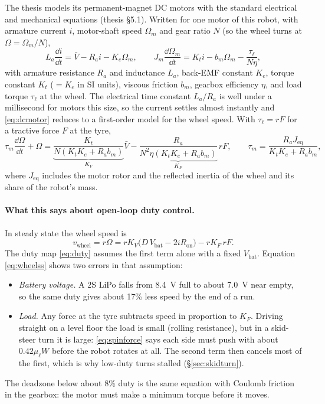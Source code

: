 The thesis models its permanent-magnet DC motors with the standard
electrical and mechanical equations (thesis \S5.1). Written for one motor of
this robot, with armature current $i$, motor-shaft speed $\Omega_m$ and gear
ratio $N$ (so the wheel turns at $\Omega=\Omega_m/N$),
\begin{equation}\label{eq:dcmotor}
L_a\frac{\dd i}{\dd t} = \bar V - R_a i - K_e\Omega_m,\qquad
J_m\frac{\dd\Omega_m}{\dd t} = K_t i - b_m\Omega_m - \frac{\tau_\ell}{N\eta},
\end{equation}
with armature resistance $R_a$ and inductance $L_a$, back-EMF constant
$K_e$, torque constant $K_t$ ($=K_e$ in SI units), viscous friction $b_m$,
gearbox efficiency $\eta$, and load torque $\tau_\ell$ at the wheel. The
electrical time constant $L_a/R_a$ is well under a millisecond for motors
this size, so the current settles almost instantly and
\eqref{eq:dcmotor} reduces to a first-order model for the wheel speed. With
$\tau_\ell = r F$ for a tractive force $F$ at the tyre,
\begin{equation}\label{eq:motor1st}
\tau_m\frac{\dd\Omega}{\dd t} + \Omega
 = \underbrace{\frac{K_t}{N(K_tK_e+R_ab_m)}}_{K_V} \bar V
 - \underbrace{\frac{R_a}{N^2\eta(K_tK_e+R_ab_m)}}_{K_F}\, rF,
\qquad
\tau_m=\frac{R_aJ_{\mathrm{eq}}}{K_tK_e+R_ab_m},
\end{equation}
where $J_{\mathrm{eq}}$ includes the motor rotor and the reflected inertia of
the wheel and its share of the robot's mass.

\paragraph{What this says about open-loop duty control.} In steady state
the wheel speed is
\begin{equation}\label{eq:wheelss}
v_{\mathrm{wheel}} = r\Omega = rK_V\bigl(D\,V_{\mathrm{bat}}-2iR_{\mathrm{on}}\bigr) - rK_F\,rF .
\end{equation}
The duty map \eqref{eq:duty} assumes the first term alone with a fixed
$V_{\mathrm{bat}}$. Equation \eqref{eq:wheelss} shows two errors in that
assumption:
\begin{itemize}
\item \emph{Battery voltage.} A 2S LiPo falls from \SI{8.4}{V} full to about
  \SI{7.0}{V} near empty, so the same duty gives about 17\% less speed by
  the end of a run.
\item \emph{Load.} Any force at the tyre subtracts speed in proportion to
  $K_F$. Driving straight on a level floor the load is small (rolling
  resistance), but in a skid-steer turn it is large: \eqref{eq:spinforce}
  says each side must push with about $0.42\mu_\ell W$ before the robot
  rotates at all. The second term then cancels most of the first, which is
  why low-duty turns stalled (\S\ref{sec:skidturn}).
\end{itemize}
The deadzone below about 8\% duty is the same equation with Coulomb friction
in the gearbox: the motor must make a minimum torque before it moves.

